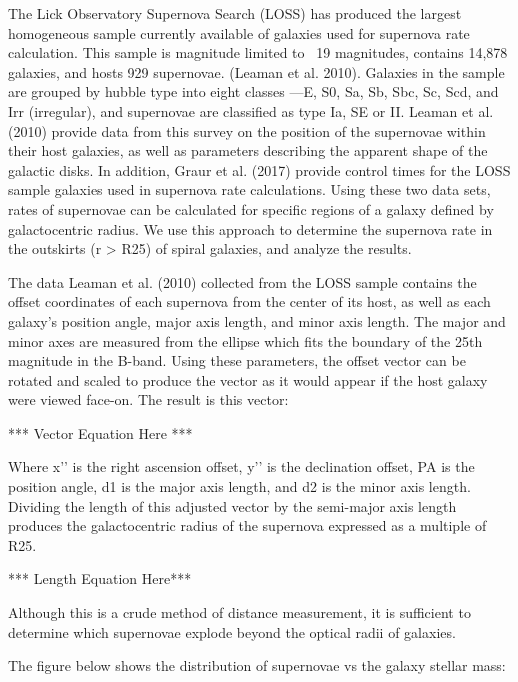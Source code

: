 \documentclass[apj]{emulateapj}
\begin{document}
The Lick Observatory Supernova Search (LOSS) has produced the largest homogeneous sample currently available of galaxies used for supernova rate calculation. This sample is magnitude limited to ~19 magnitudes, contains 14,878 galaxies, and hosts 929 supernovae. (Leaman et al. 2010). Galaxies in the sample are grouped by hubble type into eight classes —E, S0, Sa, Sb, Sbc, Sc, Scd, and Irr (irregular), and supernovae are classified as type Ia, SE or II. Leaman et al. (2010) provide data from this survey on the position of the supernovae within their host galaxies, as well as parameters describing the apparent shape of the galactic disks. In addition, Graur et al. (2017) provide control times for the LOSS sample galaxies used in supernova rate calculations. Using these two data sets, rates of supernovae can be calculated for specific regions of a galaxy defined by galactocentric radius. We use this approach to determine the supernova rate in the outskirts (r > R25) of spiral galaxies, and analyze the results.

The data Leaman et al. (2010) collected from the LOSS sample contains the offset coordinates of each supernova from the center of its host, as well as each galaxy’s position angle, major axis length, and minor axis length. The major and minor axes are measured from the ellipse which fits the boundary of the 25th magnitude in the B-band. Using these parameters, the offset vector can be rotated and scaled to produce the vector as it would appear if the host galaxy were viewed face-on. The result is this vector:

*** Vector Equation Here ***

Where x’’ is the right ascension offset, y’’ is the declination offset, PA is the position angle, d1 is the major axis length, and d2 is the minor axis length. Dividing the length of this adjusted vector by the semi-major axis length produces the galactocentric radius of the supernova expressed as a multiple of R25.

*** Length Equation Here***

Although this is a crude method of distance measurement, it is sufficient to determine which supernovae explode beyond the optical radii of galaxies.

The figure below shows the distribution of supernovae vs the galaxy stellar mass:
\end{document}
